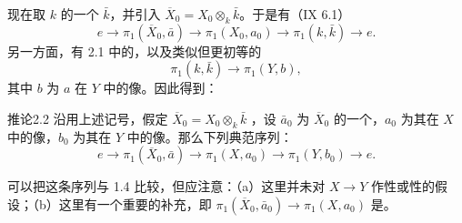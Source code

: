 现在取 $k$ 的一个 $\bar k$，并引入 $\overline X_0=X_0\otimes_k\bar k$。于是有（IX 6.1）
\[
e\longrightarrow\pi_1(\overline X_0,\bar a)\longrightarrow\pi_1(X_0,a_0)
\longrightarrow\pi_1(k,\bar k)\longrightarrow e.
\]
另一方面，有 2.1 中的，以及类似但更初等的
\[
\pi_1(k,\bar k)\longrightarrow\pi_1(Y,b),
\]
其中 $b$ 为 $a$ 在 $Y$ 中的像。因此得到：
\begin{SGAresult}{推论}{2.2}
沿用上述记号，假定 $\overline X_0=X_0\otimes_k\bar k$ ，设 $\bar a_0$ 为 $\overline X_0$ 的一个，$a_0$ 为其在 $X$ 中的像，$b_0$ 为其在 $Y$ 中的像。那么下列典范序列：
\[
e\longrightarrow\pi_1(\overline X_0,\bar a)\longrightarrow\pi_1(X,a_0)
\longrightarrow\pi_1(Y,b_0)\longrightarrow e.
\]
\end{SGAresult}
可以把这条序列与 1.4 比较，但应注意：（a）这里并未对 $X\to Y$ 作性或性的假设；（b）这里有一个重要的补充，即 $\pi_1(\overline X_0,\bar a_0)\to\pi_1(X,a_0)$ 是。

